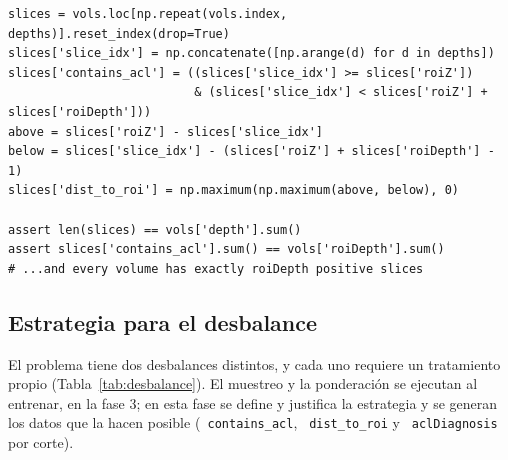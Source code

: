 \documentclass[12pt,letterpaper]{article}
\newcommand{\code}[1]{\texttt{\hyphenchar\font=-1 #1}}
\begin{document}
\begin{lstlisting}[caption={Expansión a cortes y autoverificaciones (\code{src/data/slices.py}, abreviado).}, label={lst:slices}]
slices = vols.loc[np.repeat(vols.index, depths)].reset_index(drop=True)
slices['slice_idx'] = np.concatenate([np.arange(d) for d in depths])
slices['contains_acl'] = ((slices['slice_idx'] >= slices['roiZ'])
                          & (slices['slice_idx'] < slices['roiZ'] + slices['roiDepth']))
above = slices['roiZ'] - slices['slice_idx']
below = slices['slice_idx'] - (slices['roiZ'] + slices['roiDepth'] - 1)
slices['dist_to_roi'] = np.maximum(np.maximum(above, below), 0)

assert len(slices) == vols['depth'].sum()
assert slices['contains_acl'].sum() == vols['roiDepth'].sum()
# ...and every volume has exactly roiDepth positive slices
\end{lstlisting}

\subsection{Estrategia para el desbalance}\label{sec:desbalance}

El problema tiene dos desbalances distintos, y cada uno requiere un tratamiento propio (Tabla~\ref{tab:desbalance}). El muestreo y la ponderación se ejecutan al entrenar, en la fase 3; en esta fase se define y justifica la estrategia y se generan los datos que la hacen posible (\code{contains\_acl}, \code{dist\_to\_roi} y \code{aclDiagnosis} por corte).
\end{document}
